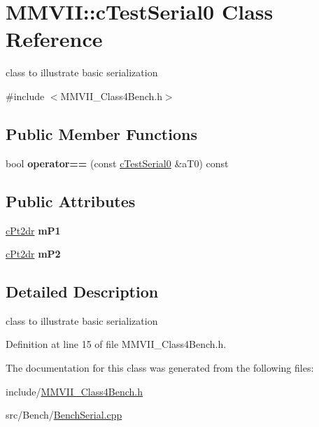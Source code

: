 \hypertarget{classMMVII_1_1cTestSerial0}{}\section{M\+M\+V\+II\+:\+:c\+Test\+Serial0 Class Reference}
\label{classMMVII_1_1cTestSerial0}


class to illustrate basic serialization  




{\ttfamily \#include $<$M\+M\+V\+I\+I\+\_\+\+Class4\+Bench.\+h$>$}

\subsection*{Public Member Functions}
\begin{DoxyCompactItemize}
\item 
bool {\bfseries operator==} (const \hyperlink{classMMVII_1_1cTestSerial0}{c\+Test\+Serial0} \&a\+T0) const \hypertarget{classMMVII_1_1cTestSerial0_ab7cb5894121a05347ba5ac74f8600056}{}\label{classMMVII_1_1cTestSerial0_ab7cb5894121a05347ba5ac74f8600056}

\end{DoxyCompactItemize}
\subsection*{Public Attributes}
\begin{DoxyCompactItemize}
\item 
\hyperlink{classMMVII_1_1cPt2d}{c\+Pt2dr} {\bfseries m\+P1}\hypertarget{classMMVII_1_1cTestSerial0_a339719218f16b847619be404572d96ff}{}\label{classMMVII_1_1cTestSerial0_a339719218f16b847619be404572d96ff}

\item 
\hyperlink{classMMVII_1_1cPt2d}{c\+Pt2dr} {\bfseries m\+P2}\hypertarget{classMMVII_1_1cTestSerial0_aa74d2fceb8d88dd220b9caffdb620afd}{}\label{classMMVII_1_1cTestSerial0_aa74d2fceb8d88dd220b9caffdb620afd}

\end{DoxyCompactItemize}


\subsection{Detailed Description}
class to illustrate basic serialization 

Definition at line 15 of file M\+M\+V\+I\+I\+\_\+\+Class4\+Bench.\+h.



The documentation for this class was generated from the following files\+:\begin{DoxyCompactItemize}
\item 
include/\hyperlink{MMVII__Class4Bench_8h}{M\+M\+V\+I\+I\+\_\+\+Class4\+Bench.\+h}\item 
src/\+Bench/\hyperlink{BenchSerial_8cpp}{Bench\+Serial.\+cpp}\end{DoxyCompactItemize}
